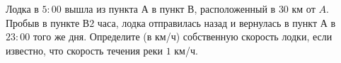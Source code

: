 \begin{ex}
	\begin{condition}
		Лодка в \( 5:00  \) вышла из пункта \( А  \) в пункт \( В \), расположенный в \( 30  \) км от \( A \). Пробыв в пункте \(  В 2  \) часа, лодка отправилась назад и вернулась в пункт \( А  \) в \( 23:00  \) того же дня. Определите (в км/ч) собственную скорость лодки, если известно, что скорость течения реки \( 1  \) км/ч.
	\end{condition}
\end{ex}